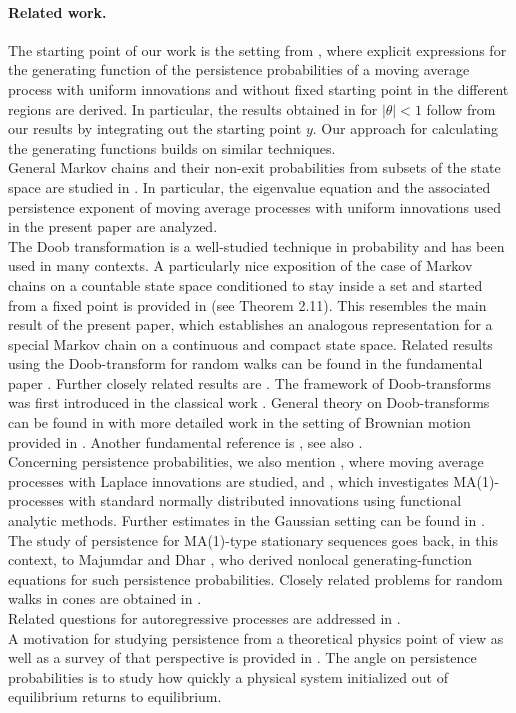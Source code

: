 \documentclass[12pt]{article}
\newcommand{\1}{\mathds{1}}
\theoremstyle{definition}
\theoremstyle{plain}
\theoremstyle{remark}
\begin{document}
\paragraph{Related work.}
The starting point of our work is the setting from \cite{AurzadaRaschel}, where explicit expressions for the generating function of the persistence probabilities of a moving average process with uniform innovations and without fixed starting point in the different regions are derived. In particular, the results obtained in \cite{AurzadaRaschel} for $|\theta|<1$ follow from our results by integrating out the starting point $y$. Our approach for calculating the generating functions builds on similar techniques.
\\General Markov chains and their non-exit probabilities from subsets of the state space are studied in \cite{AMZ}. In particular, the eigenvalue equation and the associated persistence exponent of moving average processes with uniform innovations used in the present paper are analyzed.
\\ The Doob transformation is a well-studied technique in probability and has been used in many contexts. A particularly nice exposition of the case of Markov chains on a countable state space conditioned to stay inside a set and started from a fixed point is provided in \cite{Swart} (see Theorem 2.11). This resembles the main result of the present paper, which establishes an analogous representation for a special Markov chain on a continuous and compact state space. Related results using the Doob-transform for random walks can be found in the fundamental paper \cite{BertoinDoney}. Further closely related results are \cite{Wachtel1,Wachtel4,Wachtel6,Wachtel7,Wachtel2,Wachtel3,EichelsbacherKonig}. The framework of Doob-transforms was first introduced in the classical work \cite{doob}. General theory on Doob-transforms can be found in \cite{RogersWilliams1} with more detailed work in the setting of Brownian motion provided in \cite{RogersWilliams2}. Another fundamental reference is \cite{ColletMartinezSanMartin}, see also \cite{ChampagnatVillemonais2016, SenetaVereJones}.
\\Concerning persistence probabilities, we also mention \cite{aurzada2025persistenceprobabilitiesma1sequences}, where moving average processes with Laplace innovations are studied, and \cite{2}, which investigates MA(1)-processes with standard normally distributed innovations using functional analytic methods. Further estimates in the Gaussian setting can be found in \cite{12}. The study of persistence for MA(1)-type stationary sequences goes back, in this context, to Majumdar and Dhar \cite{15}, who derived nonlocal generating-function equations for such persistence probabilities. Closely related problems for random walks in cones are obtained in \cite{Wachtel5}.
\\ Related questions for autoregressive processes are addressed in \cite{1,3,5,9,DonnartSimon,11,14}.
\\A motivation for studying persistence from a theoretical physics point of view as well as a survey of that perspective is provided in  \cite{8}. The angle on persistence probabilities is to study how quickly a physical system initialized out of equilibrium returns to equilibrium.
\end{document}
